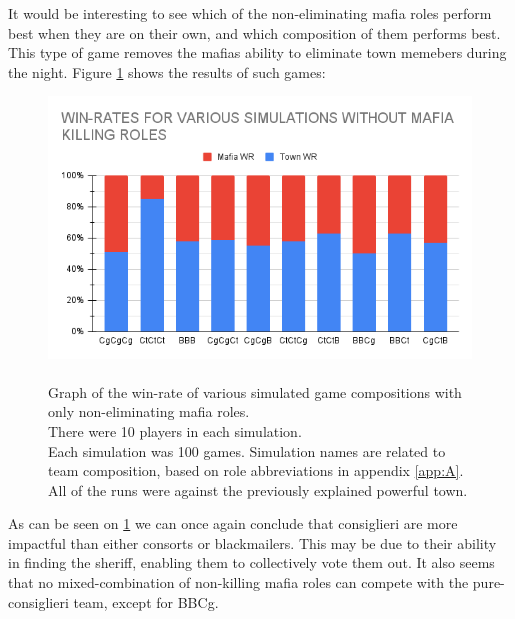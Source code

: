 It would be interesting to see which of the non-eliminating mafia roles perform
best when they are on their own, and which composition of them performs best.
This type of game removes the mafias ability to eliminate town memebers during the night. 
Figure \ref{fig:VariousSimulationsNonKilling} shows the results of such games:
\begin{figure}[H]
    \includegraphics[width=1\linewidth]{figures/Winrates_NonKilling}
    \caption{\\Graph of the win-rate of various simulated game compositions
        with only non-eliminating mafia roles.\\
        There were 10 players in each simulation.\\
        Each simulation was 100 games.
        Simulation names are related to team composition, based on role
        abbreviations in appendix \ref{app:A}.\\
        All of the runs were against the previously explained powerful town.}
    \label{fig:VariousSimulationsNonKilling}
\end{figure}
\vspace{-5px} As can be seen on \cref{fig:VariousSimulationsNonKilling} we can once again conclude that
consiglieri are more impactful than either consorts or blackmailers. This may
be due to their ability in finding the sheriff, enabling them to
collectively vote them out. It also seems that no mixed-combination of
non-killing mafia roles can compete with the pure-consiglieri team, except for BBCg.
